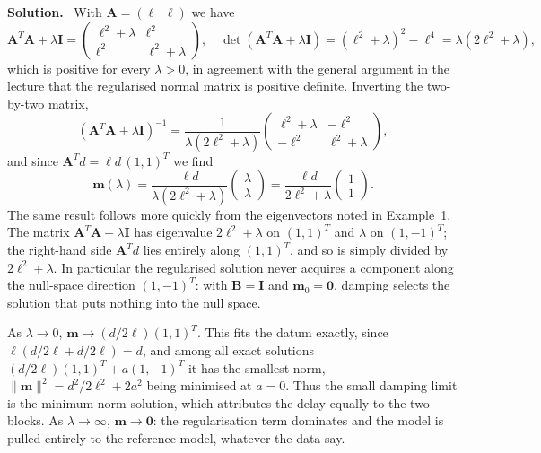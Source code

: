 \documentclass[a4paper,12pt]{paper}
\newenvironment{solution}{\par\noindent\textbf{Solution.}\ }{\par\medskip}
\begin{document}
\begin{solution}
With $\mathbf{A}=(\ell\;\;\ell)$ we have
\begin{equation}
    \mathbf{A}^{T}\mathbf{A}+\lambda\mathbf{I} = \begin{pmatrix} \ell^{2}+\lambda & \ell^{2} \\
    \ell^{2} & \ell^{2}+\lambda \end{pmatrix},\quad
    \det(\mathbf{A}^{T}\mathbf{A}+\lambda\mathbf{I}) = (\ell^{2}+\lambda)^{2}-\ell^{4} = \lambda(2\ell^{2}+\lambda),
    \label{eq:12}
\end{equation}
which is positive for every $\lambda>0$, in agreement with the general argument in the lecture that
the regularised normal matrix is positive definite. Inverting the two-by-two matrix,
\begin{equation}
    (\mathbf{A}^{T}\mathbf{A}+\lambda\mathbf{I})^{-1} = \frac{1}{\lambda(2\ell^{2}+\lambda)}
    \begin{pmatrix} \ell^{2}+\lambda & -\ell^{2} \\ -\ell^{2} & \ell^{2}+\lambda \end{pmatrix},
    \label{eq:13}
\end{equation}
and since $\mathbf{A}^{T}d = \ell d\,(1,1)^{T}$ we find
\begin{equation}
    \mathbf{m}(\lambda) = \frac{\ell d}{\lambda(2\ell^{2}+\lambda)}
    \begin{pmatrix} \lambda \\ \lambda \end{pmatrix}
    = \frac{\ell d}{2\ell^{2}+\lambda}\begin{pmatrix} 1 \\ 1 \end{pmatrix}.
    \label{eq:14}
\end{equation}
The same result follows more quickly from the eigenvectors noted in Example~1. The matrix
$\mathbf{A}^{T}\mathbf{A}+\lambda\mathbf{I}$ has eigenvalue $2\ell^{2}+\lambda$ on $(1,1)^{T}$ and
$\lambda$ on $(1,-1)^{T}$; the right-hand side $\mathbf{A}^{T}d$ lies entirely along $(1,1)^{T}$, and
so is simply divided by $2\ell^{2}+\lambda$. In particular the regularised solution never acquires a
component along the null-space direction $(1,-1)^{T}$: with $\mathbf{B}=\mathbf{I}$ and
$\mathbf{m}_{0}=\mathbf{0}$, damping selects the solution that puts nothing into the null space.

As $\lambda\to0$, $\mathbf{m}\to(d/2\ell)(1,1)^{T}$. This fits the datum exactly, since
$\ell(d/2\ell + d/2\ell) = d$, and among all exact solutions $(d/2\ell)(1,1)^{T}+a(1,-1)^{T}$ it has the
smallest norm, $\|\mathbf{m}\|^{2} = d^{2}/2\ell^{2} + 2a^{2}$ being minimised at $a=0$. Thus the small
damping limit is the minimum-norm solution, which attributes the delay equally to the two blocks. As
$\lambda\to\infty$, $\mathbf{m}\to\mathbf{0}$: the regularisation term dominates and the model is
pulled entirely to the reference model, whatever the data say.


\end{solution}
\end{document}
